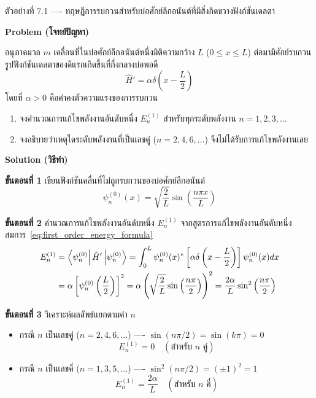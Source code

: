 \begin{psctbox}{ตัวอย่างที่ 7.1 ---- ทฤษฎีการรบกวนสำหรับบ่อศักย์ลึกอนันต์ที่มีสิ่งกีดขวางฟังก์ชันเดลตา}

\textbf{Problem (โจทย์ปัญหา)}

อนุภาคมวล $m$ เคลื่อนที่ในบ่อศักย์ลึกอนันต์หนึ่งมิติความกว้าง $L$ ($0 \le x \le L$) ต่อมามีศักย์รบกวนรูปฟังก์ชันเดลตาของดิแรกเกิดขึ้นที่กึ่งกลางบ่อพอดี
\begin{equation*}
\hat{H}' = \alpha \delta\left( x - \frac{L}{2} \right)
\end{equation*}
โดยที่ $\alpha > 0$ คือค่าคงตัวความแรงของการรบกวน
\begin{enumerate}
    \item จงคำนวณการแก้ไขพลังงานอันดับหนึ่ง $E_n^{(1)}$ สำหรับทุกระดับพลังงาน $n = 1, 2, 3, \dots$
    \item จงอธิบายว่าเหตุใดระดับพลังงานที่เป็นเลขคู่ ($n = 2, 4, 6, \dots$) จึงไม่ได้รับการแก้ไขพลังงานเลย
\end{enumerate}

\textbf{Solution (วิธีทำ)}

\textbf{ขั้นตอนที่ 1} เขียนฟังก์ชันคลื่นที่ไม่ถูกรบกวนของบ่อศักย์ลึกอนันต์
\begin{equation*}
\psi_n^{(0)}(x) = \sqrt{\frac{2}{L}} \sin\left( \frac{n\pi x}{L} \right)
\end{equation*}

\textbf{ขั้นตอนที่ 2} คำนวณการแก้ไขพลังงานอันดับหนึ่ง $E_n^{(1)}$
จากสูตรการแก้ไขพลังงานอันดับหนึ่ง สมการ~\eqref{eq:first_order_energy_formula}
\begin{align*}
E_n^{(1)} &= \bra{\psi_n^{(0)}} \hat{H}' \ket{\psi_n^{(0)}} = \int_0^L \psi_n^{(0)}(x)^* \left[ \alpha \delta\left(x - \frac{L}{2}\right) \right] \psi_n^{(0)}(x) dx \\
&= \alpha \left[ \psi_n^{(0)}\left(\frac{L}{2}\right) \right]^2 = \alpha \left( \sqrt{\frac{2}{L}} \sin\left( \frac{n\pi}{2} \right) \right)^2 = \frac{2\alpha}{L} \sin^2\left( \frac{n\pi}{2} \right)
\end{align*}

\textbf{ขั้นตอนที่ 3} วิเคราะห์ผลลัพธ์แยกตามค่า $n$
\begin{itemize}
    \item กรณี $n$ เป็นเลขคู่ ($n = 2, 4, 6, \dots$) ---- $\sin(n\pi/2) = \sin(k\pi) = 0$
    \begin{equation*}
    E_n^{(1)} = 0 \quad (\text{สำหรับ } n \text{ คู่})
    \end{equation*}
    \item กรณี $n$ เป็นเลขคี่ ($n = 1, 3, 5, \dots$) ---- $\sin^2(n\pi/2) = (\pm 1)^2 = 1$
    \begin{equation*}
    E_n^{(1)} = \frac{2\alpha}{L} \quad (\text{สำหรับ } n \text{ คี่})
    \end{equation*}
\end{itemize}


\end{psctbox}
